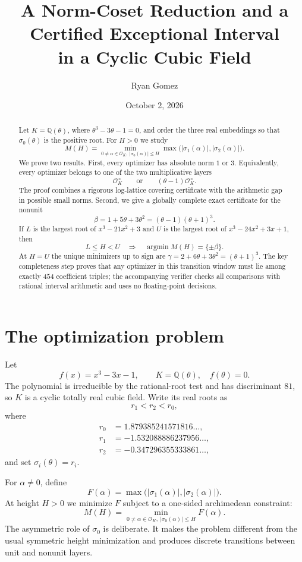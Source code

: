 \documentclass[11pt]{article}
\title{\textbf{A Norm-Coset Reduction and a Certified Exceptional Interval\\in a Cyclic Cubic Field}}
\author{Ryan Gomez}
\date{October 2, 2026}
\theoremstyle{definition}
\newcommand{\Q}{\mathbb Q}
\newcommand{\OK}{\mathcal O_K}
\begin{document}
\maketitle

\begin{abstract}
Let $K=\Q(\theta)$, where $\theta^3-3\theta-1=0$, and order the three real embeddings so that $\sigma_0(\theta)$ is the positive root.  For $H>0$ we study
\[
M(H)=\min_{0\ne\alpha\in\OK,\ |\sigma_0(\alpha)|\le H}
\max\bigl(|\sigma_1(\alpha)|,|\sigma_2(\alpha)|\bigr).
\]
We prove two results.  First, every optimizer has absolute norm $1$ or $3$.  Equivalently, every optimizer belongs to one of the two multiplicative layers
\[
\OK^\times\qquad\text{or}\qquad (\theta-1)\OK^\times.
\]
The proof combines a rigorous log-lattice covering certificate with the arithmetic gap in possible small norms.
Second, we give a globally complete exact certificate for the nonunit
\[
\beta=1+5\theta+3\theta^2=(\theta-1)(\theta+1)^3.
\]
If $L$ is the largest root of $x^3-21x^2+3$ and $U$ is the largest root of
$x^3-24x^2+3x+1$, then
\[
L\le H<U\quad\Longrightarrow\quad
\operatorname*{argmin} M(H)=\{\pm\beta\}.
\]
At $H=U$ the unique minimizers up to sign are
$\gamma=2+6\theta+3\theta^2=(\theta+1)^3$.
The key completeness step proves that any optimizer in this transition window must lie among exactly $454$ coefficient triples; the accompanying verifier checks all comparisons with rational interval arithmetic and uses no floating-point decisions.
\end{abstract}

\section{The optimization problem}
Let
\[
f(x)=x^3-3x-1,
\qquad K=\Q(\theta),\quad f(\theta)=0.
\]
The polynomial is irreducible by the rational-root test and has discriminant $81$, so $K$ is a cyclic totally real cubic field.  Write its real roots as
\[
r_1<r_2<r_0,
\]
where
\[
\begin{aligned}
r_0&=1.879385241571816\ldots,\\
r_1&=-1.532088886237956\ldots,\\
r_2&=-0.347296355333861\ldots,
\end{aligned}
\]
and set $\sigma_i(\theta)=r_i$.

For $\alpha\ne0$, define
\[
F(\alpha)=\max\bigl(|\sigma_1(\alpha)|,|\sigma_2(\alpha)|\bigr).
\]
At height $H>0$ we minimize $F$ subject to a one-sided archimedean constraint:
\begin{equation}\label{eq:M}
M(H)=\min_{0\ne\alpha\in\OK,\ |\sigma_0(\alpha)|\le H}F(\alpha).
\end{equation}
The asymmetric role of $\sigma_0$ is deliberate.  It makes the problem different from the usual symmetric height minimization and produces discrete transitions between unit and nonunit layers.
\end{document}
